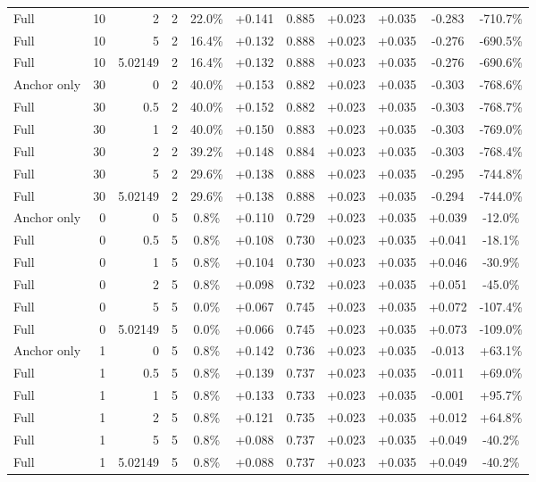 \begin{table}[htbp]
\begin{tabular}{lrrrccccccc}
Full & 10 & 2 & 2 & 22.0\% & +0.141 & 0.885 & +0.023 & +0.035 & -0.283 & -710.7\% \\
Full & 10 & 5 & 2 & 16.4\% & +0.132 & 0.888 & +0.023 & +0.035 & -0.276 & -690.5\% \\
Full & 10 & 5.02149 & 2 & 16.4\% & +0.132 & 0.888 & +0.023 & +0.035 & -0.276 & -690.6\% \\
Anchor only & 30 & 0 & 2 & 40.0\% & +0.153 & 0.882 & +0.023 & +0.035 & -0.303 & -768.6\% \\
Full & 30 & 0.5 & 2 & 40.0\% & +0.152 & 0.882 & +0.023 & +0.035 & -0.303 & -768.7\% \\
Full & 30 & 1 & 2 & 40.0\% & +0.150 & 0.883 & +0.023 & +0.035 & -0.303 & -769.0\% \\
Full & 30 & 2 & 2 & 39.2\% & +0.148 & 0.884 & +0.023 & +0.035 & -0.303 & -768.4\% \\
Full & 30 & 5 & 2 & 29.6\% & +0.138 & 0.888 & +0.023 & +0.035 & -0.295 & -744.8\% \\
Full & 30 & 5.02149 & 2 & 29.6\% & +0.138 & 0.888 & +0.023 & +0.035 & -0.294 & -744.0\% \\
Anchor only & 0 & 0 & 5 & 0.8\% & +0.110 & 0.729 & +0.023 & +0.035 & +0.039 & -12.0\% \\
Full & 0 & 0.5 & 5 & 0.8\% & +0.108 & 0.730 & +0.023 & +0.035 & +0.041 & -18.1\% \\
Full & 0 & 1 & 5 & 0.8\% & +0.104 & 0.730 & +0.023 & +0.035 & +0.046 & -30.9\% \\
Full & 0 & 2 & 5 & 0.8\% & +0.098 & 0.732 & +0.023 & +0.035 & +0.051 & -45.0\% \\
Full & 0 & 5 & 5 & 0.0\% & +0.067 & 0.745 & +0.023 & +0.035 & +0.072 & -107.4\% \\
Full & 0 & 5.02149 & 5 & 0.0\% & +0.066 & 0.745 & +0.023 & +0.035 & +0.073 & -109.0\% \\
Anchor only & 1 & 0 & 5 & 0.8\% & +0.142 & 0.736 & +0.023 & +0.035 & -0.013 & +63.1\% \\
Full & 1 & 0.5 & 5 & 0.8\% & +0.139 & 0.737 & +0.023 & +0.035 & -0.011 & +69.0\% \\
Full & 1 & 1 & 5 & 0.8\% & +0.133 & 0.733 & +0.023 & +0.035 & -0.001 & +95.7\% \\
Full & 1 & 2 & 5 & 0.8\% & +0.121 & 0.735 & +0.023 & +0.035 & +0.012 & +64.8\% \\
Full & 1 & 5 & 5 & 0.8\% & +0.088 & 0.737 & +0.023 & +0.035 & +0.049 & -40.2\% \\
Full & 1 & 5.02149 & 5 & 0.8\% & +0.088 & 0.737 & +0.023 & +0.035 & +0.049 & -40.2\% \\

\end{tabular}
\end{table}
